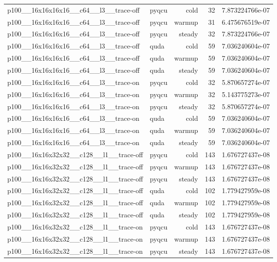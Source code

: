 \begin{table}[htbp]
\begin{tabular}{@{}llrrr@{}}
p100\_\_16x16x16x16\_\_c64\_\_l3\_\_trace-off & pyqcu & cold & 32 & 7.873224766e-07 \\
p100\_\_16x16x16x16\_\_c64\_\_l3\_\_trace-off & pyqcu & warmup & 31 & 6.475676519e-07 \\
p100\_\_16x16x16x16\_\_c64\_\_l3\_\_trace-off & pyqcu & steady & 32 & 7.873224766e-07 \\
p100\_\_16x16x16x16\_\_c64\_\_l3\_\_trace-off & quda & cold & 59 & 7.036240604e-07 \\
p100\_\_16x16x16x16\_\_c64\_\_l3\_\_trace-off & quda & warmup & 59 & 7.036240604e-07 \\
p100\_\_16x16x16x16\_\_c64\_\_l3\_\_trace-off & quda & steady & 59 & 7.036240604e-07 \\
p100\_\_16x16x16x16\_\_c64\_\_l3\_\_trace-on & pyqcu & cold & 32 & 5.870657274e-07 \\
p100\_\_16x16x16x16\_\_c64\_\_l3\_\_trace-on & pyqcu & warmup & 32 & 5.143775273e-07 \\
p100\_\_16x16x16x16\_\_c64\_\_l3\_\_trace-on & pyqcu & steady & 32 & 5.870657274e-07 \\
p100\_\_16x16x16x16\_\_c64\_\_l3\_\_trace-on & quda & cold & 59 & 7.036240604e-07 \\
p100\_\_16x16x16x16\_\_c64\_\_l3\_\_trace-on & quda & warmup & 59 & 7.036240604e-07 \\
p100\_\_16x16x16x16\_\_c64\_\_l3\_\_trace-on & quda & steady & 59 & 7.036240604e-07 \\
p100\_\_16x16x32x32\_\_c128\_\_l1\_\_trace-off & pyqcu & cold & 143 & 1.676727437e-08 \\
p100\_\_16x16x32x32\_\_c128\_\_l1\_\_trace-off & pyqcu & warmup & 143 & 1.676727437e-08 \\
p100\_\_16x16x32x32\_\_c128\_\_l1\_\_trace-off & pyqcu & steady & 143 & 1.676727437e-08 \\
p100\_\_16x16x32x32\_\_c128\_\_l1\_\_trace-off & quda & cold & 102 & 1.779427959e-08 \\
p100\_\_16x16x32x32\_\_c128\_\_l1\_\_trace-off & quda & warmup & 102 & 1.779427959e-08 \\
p100\_\_16x16x32x32\_\_c128\_\_l1\_\_trace-off & quda & steady & 102 & 1.779427959e-08 \\
p100\_\_16x16x32x32\_\_c128\_\_l1\_\_trace-on & pyqcu & cold & 143 & 1.676727437e-08 \\
p100\_\_16x16x32x32\_\_c128\_\_l1\_\_trace-on & pyqcu & warmup & 143 & 1.676727437e-08 \\
p100\_\_16x16x32x32\_\_c128\_\_l1\_\_trace-on & pyqcu & steady & 143 & 1.676727437e-08 \\

\end{tabular}
\end{table}
